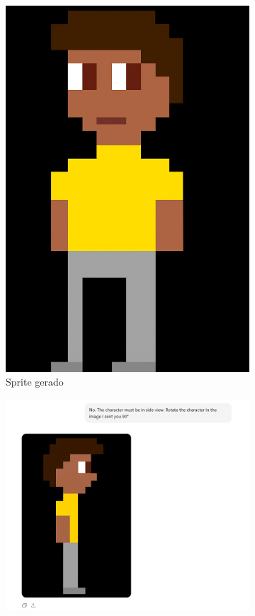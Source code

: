 \begin{figure}[htbp]
\begin{subfigure}{0.2\linewidth}
        \includegraphics[width=1\linewidth]{figs/chatGPT/visao_lateral/res1_pixel.png}
        \caption{\small Sprite gerado}
        \label{fig:chatGPT1b}
    \end{subfigure}
        \begin{subfigure}{0.75\linewidth}
        \includegraphics[width=1\linewidth]{figs/chatGPT/visao_lateral/tela2_pixel.PNG}

\end{subfigure}
\end{figure}
